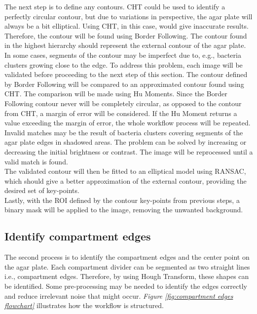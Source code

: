 \noindent The next step is to define any contours. CHT could be used to identify a perfectly circular contour, but due to variations in perspective, the agar plate will always be a bit elliptical. Using CHT, in this case, would give inaccurate results. Therefore, the contour will be found using Border Following. The contour found in the highest hierarchy should represent the external contour of the agar plate. \\

\noindent In some cases, segments of the contour may be imperfect due to, e.g., bacteria clusters growing close to the edge. To address this problem, each image will be validated before proceeding to the next step of this section. The contour defined by Border Following will be compared to an approximated contour found using CHT. The comparison will be made using Hu Moments. Since the Border Following contour never will be completely circular, as opposed to the contour from CHT, a margin of error will be considered. If the Hu Moment returns a value exceeding the margin of error, the whole workflow process will be repeated. Invalid matches may be the result of bacteria clusters covering segments of the agar plate edges in shadowed areas. The problem can be solved by increasing or decreasing the initial brightness or contrast. The image will be reprocessed until a valid match is found.\\

\noindent The validated contour will then be fitted to an elliptical model using RANSAC, which should give a better approximation of the external contour, providing the desired set of key-points. \\ 

\noindent Lastly, with the ROI defined by the contour key-points from previous steps, a binary mask will be applied to the image, removing the unwanted background.\\


\subsection{Identify compartment edges}
\noindent The second process is to identify the compartment edges and the center point on the agar plate. Each compartment divider can be segmented as two straight lines i.e., compartment edges. Therefore, by using Hough Transform, these shapes can be identified. Some pre-processing may be needed to identify the edges correctly and reduce irrelevant noise that might occur. \textit{Figure \ref{fig:compartment edges flowchart} } illustrates how the workflow is structured. \\


